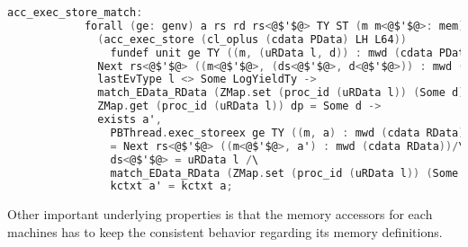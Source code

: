          
\begin{lstlisting}[language=C]     
          acc_exec_store_match:
            forall (ge: genv) a rs rd rs<@$'$@> TY ST (m m<@$'$@>: mem) ds<@$'$@> l dp d<@$'$@> d addr,
              (acc_exec_store (cl_oplus (cdata PData) LH L64)) 
                fundef unit ge TY ((m, (uRData l, d)) : mwd (cdata PData)) addr rs rd ST =
              Next rs<@$'$@> ((m<@$'$@>, (ds<@$'$@>, d<@$'$@>)) : mwd (cdata PData)) -> 
              lastEvType l <> Some LogYieldTy ->
              match_EData_RData (ZMap.set (proc_id (uRData l)) (Some d) dp) l a ->
              ZMap.get (proc_id (uRData l)) dp = Some d ->
              exists a',
                PBThread.exec_storeex ge TY ((m, a) : mwd (cdata RData)) addr rs rd ST 
                = Next rs<@$'$@> ((m<@$'$@>, a') : mwd (cdata RData))/\
                ds<@$'$@> = uRData l /\
                match_EData_RData (ZMap.set (proc_id (uRData l)) (Some d<@$'$@>) dp) l a' /\
                kctxt a' = kctxt a;
\end{lstlisting}

Other important underlying properties 
is that the memory accessors for each machines has to keep the consistent behavior 
regarding its memory definitions. 
 
